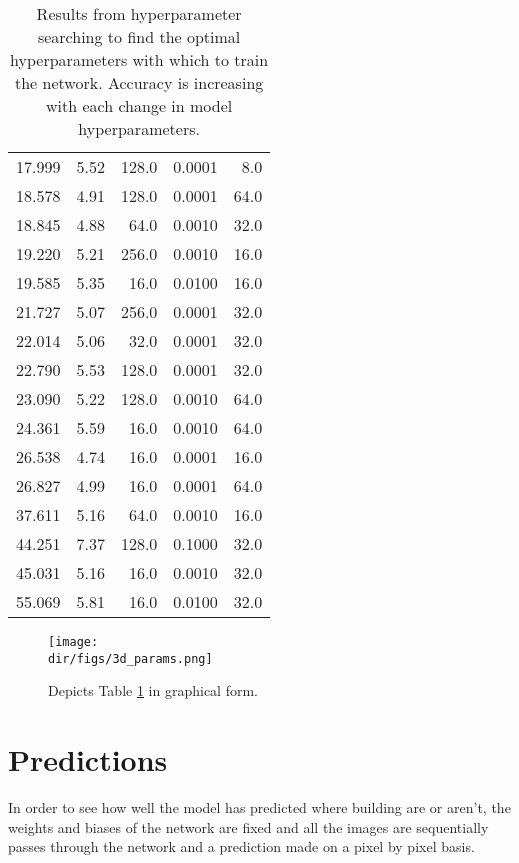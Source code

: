 \begin{table}[htpb]
\begin{adjustbox}{totalheight=\baselineskip}
\begin{tabular}{rrrrr}
   17.999 &   5.52 &       128.0 &         0.0001 &          8.0 \\
   18.578 &   4.91 &       128.0 &         0.0001 &         64.0 \\
   18.845 &   4.88 &        64.0 &         0.0010 &         32.0 \\
   19.220 &   5.21 &       256.0 &         0.0010 &         16.0 \\
   19.585 &   5.35 &        16.0 &         0.0100 &         16.0 \\
   21.727 &   5.07 &       256.0 &         0.0001 &         32.0 \\
   22.014 &   5.06 &        32.0 &         0.0001 &         32.0 \\
   22.790 &   5.53 &       128.0 &         0.0001 &         32.0 \\
   23.090 &   5.22 &       128.0 &         0.0010 &         64.0 \\
   24.361 &   5.59 &        16.0 &         0.0010 &         64.0 \\
   26.538 &   4.74 &        16.0 &         0.0001 &         16.0 \\
   26.827 &   4.99 &        16.0 &         0.0001 &         64.0 \\
   37.611 &   5.16 &        64.0 &         0.0010 &         16.0 \\
   44.251 &   7.37 &       128.0 &         0.1000 &         32.0 \\
   45.031 &   5.16 &        16.0 &         0.0010 &         32.0 \\
   55.069 &   5.81 &        16.0 &         0.0100 &         32.0 \\
\bottomrule
\end{tabular}
\end{adjustbox}
\caption[Hyperparameter Search Results]{Results from hyperparameter searching to find the optimal hyperparameters with which to train the network. Accuracy is increasing with each change in model hyperparameters.}
\label{tab.hyper_param}
\end{table}
\begin{figure}[htpb]
    \centering
    \texttt{[image: \\dir/figs/3d\_params.png]}
    \caption[3D representation of the accuracy of different hyperparamater combinations]{Depicts Table \ref{tab.hyper_param} in graphical form. }
    \label{fig.3d_hyperparams}
\end{figure}
\section{Predictions}
In order to see how well the model has predicted where building are or aren't, the weights and biases of the network are fixed and all the images are sequentially passes through the network and a prediction made on a pixel by pixel basis. 

